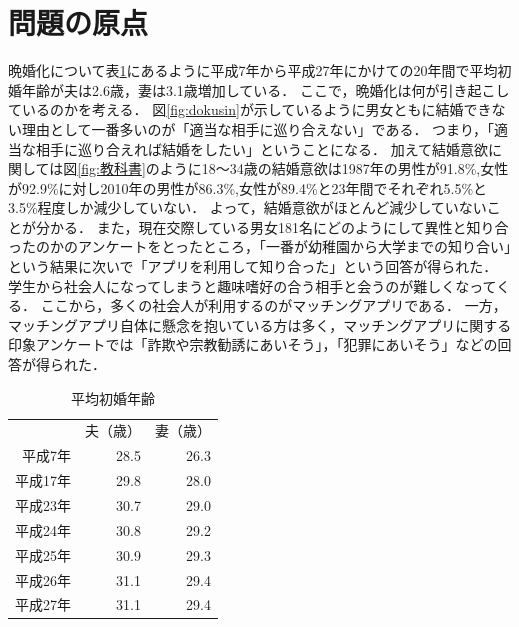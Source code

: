 \documentclass[12pt]{ltjsarticle}
\begin{document}
\section{問題の原点}
晩婚化について表\ref{table:shokon}にあるように平成7年から平成27年にかけての20年間で平均初婚年齢が夫は2.6歳，妻は3.1歳増加している．
ここで，晩婚化は何が引き起こしているのかを考える．
図\ref{fig:dokusin}が示しているように男女ともに結婚できない理由として一番多いのが「適当な相手に巡り合えない」である．
つまり，「適当な相手に巡り合えれば結婚をしたい」ということになる．
加えて結婚意欲に関しては図\ref{fig:教科書}のように18～34歳の結婚意欲は1987年の男性が91.8\%,女性が92.9\%に対し2010年の男性が86.3\%,女性が89.4\%と23年間でそれぞれ5.5\%と3.5\%程度しか減少していない．
よって，結婚意欲がほとんど減少していないことが分かる．
また，現在交際している男女181名にどのようにして異性と知り合ったのかのアンケートをとったところ，「一番が幼稚園から大学までの知り合い」という結果に次いで「アプリを利用して知り合った」という回答が得られた\cite{cancan}．
学生から社会人になってしまうと趣味嗜好の合う相手と会うのが難しくなってくる．
ここから，多くの社会人が利用するのがマッチングアプリである．
一方，マッチングアプリ自体に懸念を抱いている方は多く，マッチングアプリに関する印象アンケートでは「詐欺や宗教勧誘にあいそう」，「犯罪にあいそう」などの回答が得られた．
\begin{table}
\centering
  \caption{平均初婚年齢}
  \label{table:shokon}
  \begin{tabular}{rrr}
   & 夫（歳） & 妻（歳） \\
  平成7年 & 28.5 & 26.3 \\
  平成17年 & 29.8 & 28.0 \\
  平成23年 & 30.7 & 29.0 \\
  平成24年 & 30.8 & 29.2 \\
  平成25年 & 30.9 & 29.3 \\
  平成26年 & 31.1 & 29.4 \\
  平成27年 & 31.1 & 29.4 \\
  \end{tabular}
  \end{table}
\end{document}
